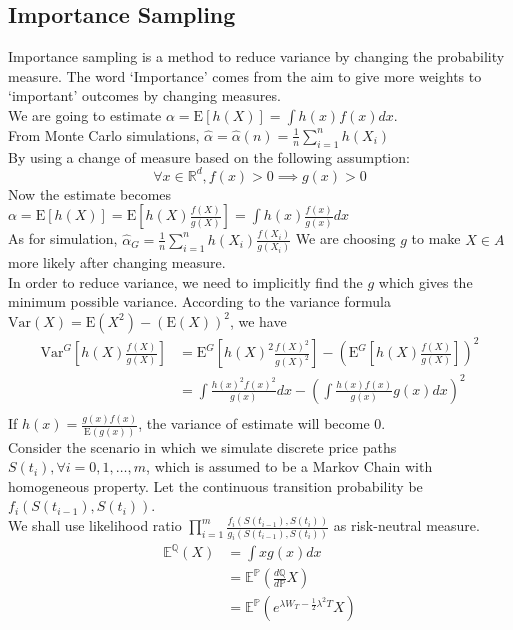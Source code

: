 \subsection{Importance Sampling}
Importance sampling is a method to reduce variance by changing the probability measure. The word `Importance' comes from the aim to give more weights to `important' outcomes by changing measures.\\
We are going to estimate $\displaystyle \alpha = \mathrm{E}[h(X)] = \int h(x)f(x) dx$.\\
From Monte Carlo simulations, $\displaystyle \hat{\alpha} = \hat{\alpha}(n) = \frac{1}{n} \sum_{i=1}^{n} h(X_{i})$\\
By using a change of measure based on the following assumption:
$$\forall x \in \mathbb{R}^{d}, f(x) > 0 \implies g(x) > 0$$
Now the estimate becomes $\displaystyle \alpha = \mathrm{E}[h(X)] = \mathrm{E}[h(X)\frac{f(X)}{g(X)}] = \int h(x)\frac{f(x)}{g(x)} dx$\\
As for simulation, $\displaystyle \hat{\alpha}_{G} = \frac{1}{n} \sum_{i=1}^{n} h(X_{i})\frac{f(X_{i})}{g(X_{i})}$
We are choosing $g$ to make ${X \in A}$ more likely after changing measure.\\
In order to reduce variance, we need to implicitly find the $g$ which gives the minimum possible variance. According to the variance formula $\mathrm{Var}(X) = \mathrm{E}(X^{2}) - (\mathrm{E}(X))^{2} $, we have
\begin{equation*}
\begin{split}
\mathrm{Var}^{G}[h(X)\frac{f(X)}{g(X)}] &= \mathrm{E}^{G}[h(X)^{2}\frac{f(X)^{2}}{g(X)^{2}}] - (\mathrm{E}^{G}[h(X)\frac{f(X)}{g(X)}])^{2}\\
&= \int \frac{h(x)^{2}f(x)^{2}}{g(x)} dx - (\int \frac{h(x)f(x)}{g(x)}g(x) dx)^{2}\\
\end{split}
\end{equation*}
If $\displaystyle h(x) = \frac{g(x)f(x)}{\mathrm{E}(g(x))}$, the variance of estimate will become 0.\\
Consider the scenario in which we simulate discrete price paths $S(t_{i}), \forall i = 0, 1, \dots, m$, which is assumed to be a Markov Chain with homogeneous property. Let the continuous transition probability be $f_{i}(S(t_{i-1}),S(t_{i}))$.\\[3mm]
We shall use likelihood ratio $\displaystyle \prod_{i=1}^{m} \frac{f_{i}(S(t_{i-1}),S(t_{i}))}{g_{i}(S(t_{i-1}),S(t_{i}))}$ as risk-neutral measure.
\begin{equation*}
\begin{split}
\mathbb{E}^{\mathbb{Q}}(X) 
&= \int x g(x) dx\\
&= \mathbb{E}^{\mathbb{P}}(\frac{d\mathbb{Q}}{d\mathbb{P}}X) \\
&= \mathbb{E}^{\mathbb{P}}(e^{\lambda W_{T} - \frac{1}{2}\lambda^{2}T}X) \\[7mm]
\end{split}
\end{equation*}
